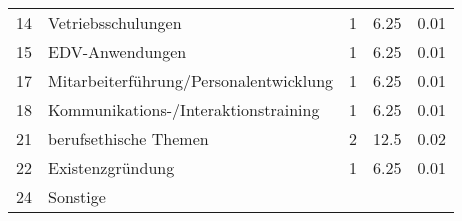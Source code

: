 \begin{longtable}{lXrrr}
     14 &
     \multicolumn{1}{X}{ Vetriebsschulungen   } &


       \num{1} &
       \num[round-mode=places,round-precision=2]{6.25} &
         \num[round-mode=places,round-precision=2]{0.01} \\

     15 &
     \multicolumn{1}{X}{ EDV-Anwendungen   } &


       \num{1} &
       \num[round-mode=places,round-precision=2]{6.25} &
         \num[round-mode=places,round-precision=2]{0.01} \\

     17 &
     \multicolumn{1}{X}{ Mitarbeiterführung/Personalentwicklung   } &


       \num{1} &
       \num[round-mode=places,round-precision=2]{6.25} &
         \num[round-mode=places,round-precision=2]{0.01} \\

     18 &
     \multicolumn{1}{X}{ Kommunikations-/Interaktionstraining   } &


       \num{1} &
       \num[round-mode=places,round-precision=2]{6.25} &
         \num[round-mode=places,round-precision=2]{0.01} \\

     21 &
     \multicolumn{1}{X}{ berufsethische Themen   } &


       \num{2} &
       \num[round-mode=places,round-precision=2]{12.5} &
         \num[round-mode=places,round-precision=2]{0.02} \\

     22 &
     \multicolumn{1}{X}{ Existenzgründung   } &


       \num{1} &
       \num[round-mode=places,round-precision=2]{6.25} &
         \num[round-mode=places,round-precision=2]{0.01} \\

     24 &
     \multicolumn{1}{X}{ Sonstige   } &



\end{longtable}
